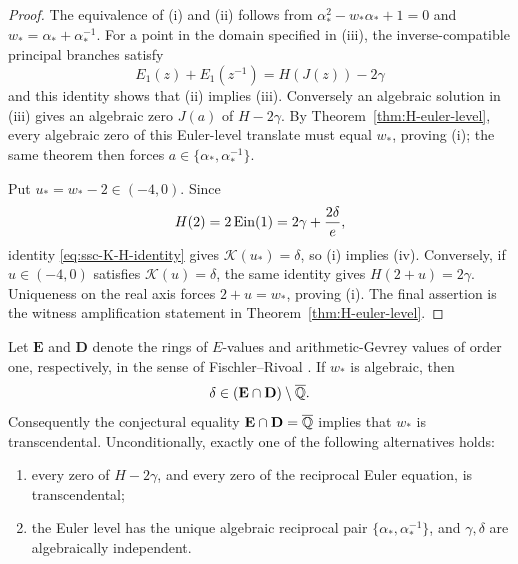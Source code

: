 \begin{proof}
The equivalence of (i) and (ii) follows from
\(\alpha_*^2-w_*\alpha_*+1=0\) and
\(w_*=\alpha_*+\alpha_*^{-1}\).  For a point in the domain specified in
(iii), the inverse-compatible principal branches satisfy
\[
 E_1(z)+E_1(z^{-1})=H(J(z))-2\gamma
\]
and this identity shows that (ii) implies (iii).  Conversely an algebraic
solution in (iii)
gives an algebraic zero \(J(a)\) of \(H-2\gamma\).  By
Theorem~\ref{thm:H-euler-level}, every algebraic zero of this Euler-level
translate must equal \(w_*\), proving (i); the same theorem then forces
\(a\in\{\alpha_*,\alpha_*^{-1}\}\).

Put \(u_*=w_*-2\in(-4,0)\).  Since
\[
 H(2)=2\operatorname{Ein}(1)=2\gamma+\frac{2\delta}{e},
\]
identity \eqref{eq:ssc-K-H-identity} gives
\(\mathcal K(u_*)=\delta\), so (i) implies (iv).  Conversely, if
\(u\in(-4,0)\) satisfies \(\mathcal K(u)=\delta\), the same identity
gives \(H(2+u)=2\gamma\).  Uniqueness on the real axis forces
\(2+u=w_*\), proving (i).  The final assertion is the witness
amplification statement in Theorem~\ref{thm:H-euler-level}.
\end{proof}

\begin{corollary}
\label{cor:ssc-ED-dichotomy}
Let \(\mathbf E\) and \(\mathbf D\) denote the rings of \(E\)-values and
arithmetic-Gevrey values of order one, respectively, in the sense of
Fischler--Rivoal \cite{FR2024ED}.  If \(w_*\) is algebraic, then
\[
 \delta\in(\mathbf E\cap\mathbf D)\setminus\overline{\mathbb Q}.
\]
Consequently the conjectural equality
\(\mathbf E\cap\mathbf D=\overline{\mathbb Q}\) implies that \(w_*\) is
transcendental.  Unconditionally, exactly one of the following alternatives
holds:
\begin{enumerate}[label=\textup{(\alph*)}]
 \item every zero of \(H-2\gamma\), and every zero of the reciprocal
       Euler equation, is transcendental;
 \item the Euler level has the unique algebraic reciprocal pair
       \(\{\alpha_*,\alpha_*^{-1}\}\), and \(\gamma,\delta\) are
       algebraically independent.
\end{enumerate}
\end{corollary}


